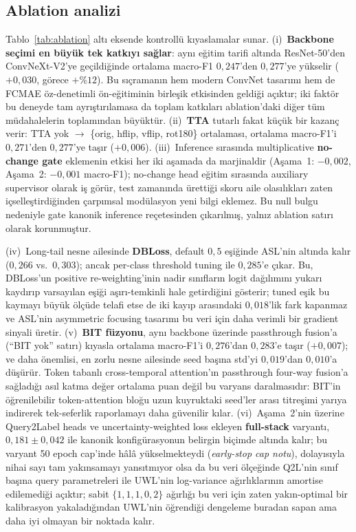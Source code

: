 \documentclass[conference]{IEEEtran}
\begin{document}
\subsection{Ablation analizi}


Tablo~\ref{tab:ablation} altı eksende kontrollü kıyaslamalar sunar. (i)~\textbf{Backbone seçimi en büyük tek katkıyı sağlar}: aynı eğitim tarifi altında ResNet-50'den ConvNeXt-V2'ye geçildiğinde ortalama macro-F1 $0{,}247$'den $0{,}277$'ye yükselir ($+0{,}030$, görece $+\%12$). Bu sıçramanın hem modern ConvNet tasarımı hem de FCMAE öz-denetimli ön-eğitiminin birleşik etkisinden geldiği açıktır; iki faktör bu deneyde tam ayrıştırılamasa da toplam katkıları ablation'daki diğer tüm müdahalelerin toplamından büyüktür. (ii)~\textbf{TTA} tutarlı fakat küçük bir kazanç verir: TTA yok $\to$ \{orig, hflip, vflip, rot180\} ortalaması, ortalama macro-F1'i $0{,}271$'den $0{,}277$'ye taşır ($+0{,}006$). (iii)~Inference sırasında multiplicative \textbf{no-change gate} eklemenin etkisi her iki aşamada da marjinaldir (Aşama~1: $-0{,}002$, Aşama~2: $-0{,}001$ macro-F1); no-change head eğitim sırasında auxiliary supervisor olarak iş görür, test zamanında ürettiği skoru aile olasılıkları zaten içselleştirdiğinden çarpımsal modülasyon yeni bilgi eklemez. Bu null bulgu nedeniyle gate kanonik inference reçetesinden çıkarılmış, yalnız ablation satırı olarak korunmuştur.

(iv)~Long-tail nesne ailesinde \textbf{DBLoss}, default $0{,}5$ eşiğinde ASL'nin altında kalır ($0{,}266$ vs.\ $0{,}303$); ancak per-class threshold tuning ile $0{,}285$'e çıkar. Bu, DBLoss'un positive re-weighting'inin nadir sınıfların logit dağılımını yukarı kaydırıp varsayılan eşiği aşırı-temkinli hale getirdiğini gösterir; tuned eşik bu kaymayı büyük ölçüde telafi etse de iki kayıp arasındaki $0{,}018$'lik fark kapanmaz ve ASL'nin asymmetric focusing tasarımı bu veri için daha verimli bir gradient sinyali üretir. (v)~\textbf{BIT füzyonu}, aynı backbone üzerinde passthrough fusion'a (``BIT yok'' satırı) kıyasla ortalama macro-F1'i $0{,}276$'dan $0{,}283$'e taşır ($+0{,}007$); ve daha önemlisi, en zorlu nesne ailesinde seed başına std'yi $0{,}019$'dan $0{,}010$'a düşürür. Token tabanlı cross-temporal attention'ın passthrough four-way fusion'a sağladığı asıl katma değer ortalama puan değil bu varyans daralmasıdır: BIT'in öğrenilebilir token-attention bloğu uzun kuyruktaki seed'ler arası titreşimi yarıya indirerek tek-seferlik raporlamayı daha güvenilir kılar. (vi)~Aşama~2'nin üzerine Query2Label heads ve uncertainty-weighted loss ekleyen \textbf{full-stack} varyantı, $0{,}181 \pm 0{,}042$ ile kanonik konfigürasyonun belirgin biçimde altında kalır; bu varyant 50 epoch cap'inde hâlâ yükselmekteydi (\emph{early-stop cap notu}), dolayısıyla nihai sayı tam yakınsamayı yansıtmıyor olsa da bu veri ölçeğinde Q2L'nin sınıf başına query parametreleri ile UWL'nin log-variance ağırlıklarının amortise edilemediği açıktır; sabit $\{1, 1, 1, 0{,}2\}$ ağırlığı bu veri için zaten yakın-optimal bir kalibrasyon yakaladığından UWL'nin öğrendiği dengeleme buradan sapan ama daha iyi olmayan bir noktada kalır.
\end{document}
